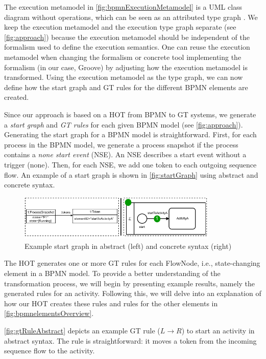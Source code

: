 \documentclass{lmcs} %
\begin{document}
The execution metamodel in \autoref{fig:bpmnExecutionMetamodel} is a UML class diagram without operations, which can be seen as an attributed type graph \cite{heckelGraphTransformationSoftware2020}.
We keep the execution metamodel and the execution type graph separate (see \autoref{fig:approach}) because the execution metamodel should be independent of the formalism used to define the execution semantics.
One can reuse the execution metamodel when changing the formalism or concrete tool implementing the formalism (in our case, Groove) by adjusting how the execution metamodel is transformed.
Using the execution metamodel as the type graph, we can now define how the start graph and GT rules for the different BPMN elements are created.

Since our approach is based on a HOT from BPMN to GT systems, we generate a \textit{start graph} and \textit{GT rules} for each given BPMN model (see \autoref{fig:approach}).
Generating the start graph for a BPMN model is straightforward.
First, for each process in the BPMN model, we generate a process snapshot if the process contains a \textit{none start event} (NSE).
An NSE describes a start event without a trigger (none).
Then, for each NSE, we add one token to each outgoing sequence flow.
An example of a start graph is shown in \autoref{fig:startGraph} using abstract and concrete syntax.

\begin{figure}[ht]
    \centering
    \includegraphics[width=0.85\textwidth]{images/startGraph.pdf}
    \caption{Example start graph in abstract (left) and concrete syntax (right)}
    \label{fig:startGraph}
\end{figure}


The HOT generates one or more GT rules for each \textsf{FlowNode}, i.e., state-changing element in a BPMN model.
To provide a better understanding of the transformation process, we will begin by presenting example results, namely the generated rules for an activity.
Following this, we will delve into an explanation of how our HOT creates these rules and rules for the other elements in \autoref{fig:bpmnelementsOverview}.

\autoref{fig:gtRuleAbstract} depicts an example GT rule ($L \to R$) to start an activity in abstract syntax.
The rule is straightforward: it moves a token from the incoming sequence flow to the activity.
\end{document}
